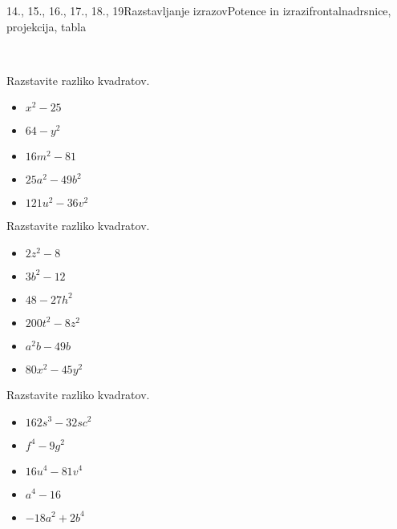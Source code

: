 \begin{priprava}{14., 15., 16., 17., 18., 19}{}{Razstavljanje izrazov}{Potence in izrazi}{frontalna}{drsnice, projekcija, tabla}
    
        ~\newline
    
    \begin{multicols}{2}
        
            \begin{naloga}
                Razstavite razliko kvadratov.
                \begin{itemize}
                    \item $x^2-25$ 
                    \item $64-y^2$ 
                    \item $16m^2-81$ 
                    \item $25a^2-49b^2$ 
                    \item $121u^2-36v^2$ 
                \end{itemize}
            \end{naloga}
        
    
        
            \begin{naloga}
                Razstavite razliko kvadratov.
                \begin{itemize}
                    \item $2z^2-8$ 
                    \item $3b^2-12$ 
                    \item $48-27h^2$ 
                    \item $200t^2-8z^2$ 
                    \item $a^2b-49b$ 
                    \item $80x^2-45y^2$ 
                \end{itemize}
            \end{naloga}
        
    
        
            \begin{naloga}
                Razstavite razliko kvadratov.
                \begin{itemize}
                    \item $162s^3-32sc^2$ 
                    \item $f^4-9g^2$ 
                    \item $16u^4-81v^4$ 
                    \item $a^4-16$ 
                    \item $-18a^2+2b^4$ 
                \end{itemize}
            \end{naloga}
        

\end{multicols}
\end{priprava}
